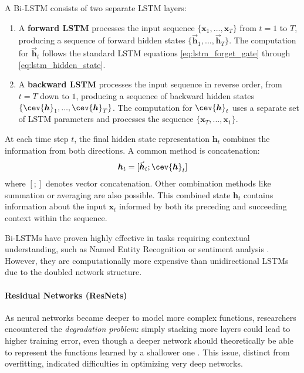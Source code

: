 A Bi-LSTM consists of two separate LSTM layers:
\begin{enumerate}
  \item A \textbf{forward LSTM} processes the input sequence \( \{\bm{x}_1, ..., \bm{x}_T\} \) from \( t=1 \) to \( T \), producing a sequence of forward hidden states \( \{\vec{\bm{h}}_1, ..., \vec{\bm{h}}_T\} \). The computation for \( \vec{\bm{h}}_t \) follows the standard LSTM equations \eqref{eq:lstm_forget_gate} through \eqref{eq:lstm_hidden_state}.
  \item A \textbf{backward LSTM} processes the input sequence in reverse order, from \( t=T \) down to \( 1 \), producing a sequence of backward hidden states \( \{\cev{\bm{h}}_1, ..., \cev{\bm{h}}_T\} \). The computation for \( \cev{\bm{h}}_t \) uses a separate set of LSTM parameters and processes the sequence \( \{\bm{x}_T, ..., \bm{x}_1\} \).
\end{enumerate}

At each time step \( t \), the final hidden state representation \( \bm{h}_t \) combines the information from both directions. A common method is concatenation:
\begin{equation}
  \bm{h}_t = [\vec{\bm{h}}_t ; \cev{\bm{h}}_t]
  \label{eq:bilstm_concat}
\end{equation}
where \( [;] \) denotes vector concatenation. Other combination methods like summation or averaging are also possible. This combined state \( \bm{h}_t \) contains information about the input \( \bm{x}_t \) informed by both its preceding and succeeding context within the sequence.

Bi-LSTMs have proven highly effective in tasks requiring contextual understanding, such as Named Entity Recognition or sentiment analysis \autocite{al2024rnn}. However, they are computationally more expensive than unidirectional LSTMs due to the doubled network structure.

\paragraph{\textbf{Residual Networks (ResNets)}}
\label{sec:resnet}

As neural networks became deeper to model more complex functions, researchers encountered the \textit{degradation problem}: simply stacking more layers could lead to higher training error, even though a deeper network should theoretically be able to represent the functions learned by a shallower one \autocite{he2016deep}. This issue, distinct from overfitting, indicated difficulties in optimizing very deep networks.


